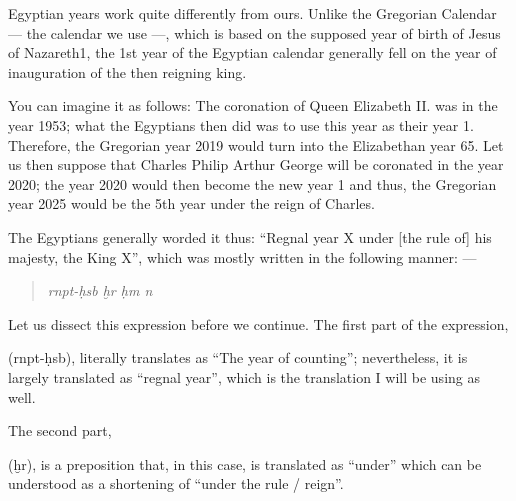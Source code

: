 \documentclass[a5paper,twoside,11pt]{report}
\newcommand{\xHiero}{ḫ}
\newcommand{\HHiero}{ḥ}
\begin{document}
			Egyptian years work quite differently from ours. Unlike the Gregorian Calendar — the calendar we use —, which is based on the supposed year of birth of Jesus of Nazareth1, the 1st year of the Egyptian calendar generally fell on the year of inauguration of the then reigning king.

			You can imagine it as follows: The coronation of Queen Elizabeth II. was in the year 1953; what the Egyptians then did was to use this year as their year 1. Therefore, the Gregorian year 2019 would turn into the Elizabethan year 65. Let us then suppose that Charles Philip Arthur George will be coronated in the year 2020; the year 2020 would then become the new year 1 and thus, the  Gregorian year 2025 would be the 5th year under the reign of Charles. 

			The Egyptians generally worded it thus: “Regnal year X under [the rule of] his majesty, the King X”, which was mostly written in the following manner: —

			\begin{quote}
				\begin{hieroglyph}{\leavevmode {}\HinterSignsSpace
{}\HinterSignsSpace
{}\HinterSignsSpace
{}\HinterSignsSpace
{}}\end{hieroglyph}
				\newline
				\textit{rnpt-\HHiero sb \xHiero r \HHiero m n}
			\end{quote}

			Let us dissect this expression before we continue. The first part of the expression, \begin{hieroglyph}{\leavevmode {}\HinterSignsSpace
{}}\end{hieroglyph} (rnpt-ḥsb), literally translates as “The year of counting”; nevertheless, it is largely translated as “regnal year”, which is the translation I will be using as well.

			The second part, \begin{hieroglyph}{\leavevmode {}}\end{hieroglyph} (ḫr), is a preposition that, in this case, is translated as “under” which can be understood as a shortening of “under the rule / reign”.
\end{document}
